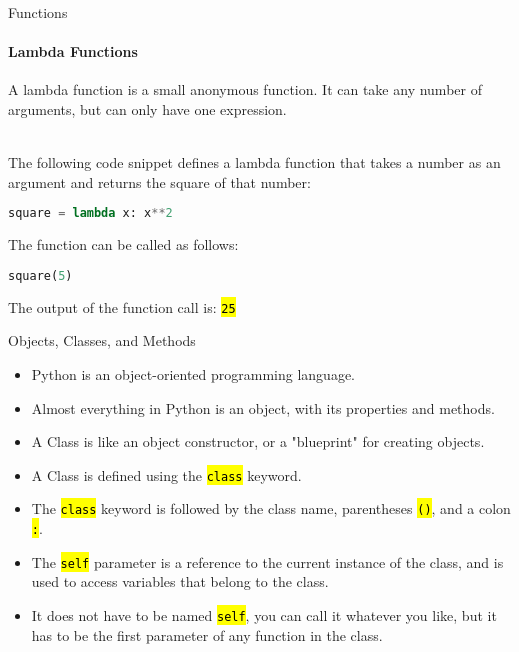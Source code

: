 \documentclass[
    aspectratio=169, 
    usepdftitle=false, 
    xcolor={dvipsnames},
    hyperref={
        colorlinks,
        linkcolor=black,
        urlcolor=blue}
    ]{beamer}
\let\OldTexttt\texttt
\renewcommand{\texttt}[1]{\OldTexttt{\hl{#1}}}%
\begin{document}
\begin{frame}[fragile]{Functions}
    \framesubtitle{Lambda Functions}
    A lambda function is a small anonymous function. It can take any number of arguments, but can only have one expression.\\~\

    The following code snippet defines a lambda function that takes a number as an argument and returns the square of that number:

    \begin{lstlisting}[language=Python]
square = lambda x: x**2
    \end{lstlisting}

    The function can be called as follows:

    \begin{lstlisting}[language=Python]
square(5)
    \end{lstlisting}

    The output of the function call is: \texttt{25}
\end{frame}

\begin{frame}[fragile]{Objects, Classes, and Methods}
    \begin{itemize}
        \item Python is an object-oriented programming language.
        \item Almost everything in Python is an object, with its properties and methods.
        \item A Class is like an object constructor, or a "blueprint" for creating objects.
        \item A Class is defined using the \texttt{class} keyword.
        \item The \texttt{class} keyword is followed by the class name, parentheses \texttt{()}, and a colon \texttt{:}.
        \item The \texttt{self} parameter is a reference to the current instance of the class, and is used to access variables that belong to the class.
        \item It does not have to be named \texttt{self}, you can call it whatever you like, but it has to be the first parameter of any function in the class.
    \end{itemize}
\end{frame}
\end{document}
